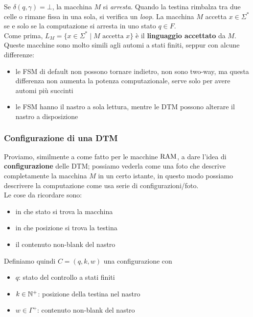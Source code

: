 Se $\delta(q, \gamma) = \bot$, la macchina $M$ si \textit{arresta}. Quando la testina rimbalza tra due celle o rimane fissa in una sola, si verifica un \textit{loop}. La macchina $M$ accetta $x \in \Sigma^\ast$ se e solo se la computazione si arresta in uno stato $q \in F$.\\

Come prima, $L_M = \{x \in \Sigma^\ast \mid M \text{ accetta } x\}$ è il \textbf{linguaggio accettato} da $M$.\\

Queste macchine sono molto simili agli automi a stati finiti, seppur con alcune differenze: 
\begin{itemize}
	\item le FSM di default non possono tornare indietro, non sono two-way, ma questa differenza non aumenta la potenza computazionale, serve solo per avere automi più succinti
	\item le FSM hanno il nastro a sola lettura, mentre le DTM possono alterare il nastro a disposizione
\end{itemize}

\subsubsection{Configurazione di una DTM}

Proviamo, similmente a come fatto per le macchine $\text{RAM}$, a dare l'idea di \textbf{configurazione} delle DTM; possiamo vederla come una foto che descrive completamente la macchina $M$ in un certo istante, in questo modo possiamo descrivere la computazione come usa serie di configurazioni/foto.\\

Le cose da ricordare sono: 
\begin{itemize}
	\item in che stato si trova la macchina
	\item in che posizione si trova la testina
	\item il contenuto non-blank del nastro
\end{itemize}

Definiamo quindi $C = (q,k,w)$ una configurazione con
\begin{itemize}
	\item $q$: stato del controllo a stati finiti
	\item $k \in \mathbb{N}^+$: posizione della testina nel nastro
	\item $w \in \Gamma^+$: contenuto non-blank del nastro
\end{itemize}

